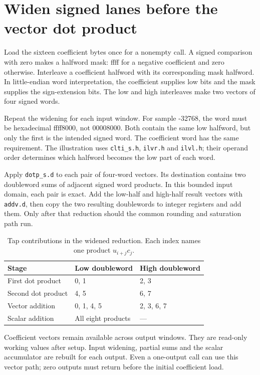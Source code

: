 \section{Widen signed lanes before the vector dot product}
Load the sixteen coefficient bytes once for a nonempty call. A signed comparison
with zero makes a halfword mask: ffff for a negative coefficient and zero otherwise.
Interleave a coefficient halfword with its corresponding mask halfword. In little-endian
word interpretation, the coefficient supplies low bits and the mask supplies the
sign-extension bits. The low and high interleaves make two vectors of four signed words.

Repeat the widening for each input window. For sample -32768, the word must be
hexadecimal ffff8000, not 00008000. Both contain the same low halfword, but only the
first is the intended signed word. The coefficient word has the same requirement.
The illustration uses \texttt{clti\_s.h}, \texttt{ilvr.h} and \texttt{ilvl.h}; their
operand order determines which halfword becomes the low part of each word.

Apply \texttt{dotp\_s.d} to each pair of four-word vectors. Its destination contains
two doubleword sums of adjacent signed word products. In this bounded input domain,
each pair is exact. Add the low-half and high-half result vectors with \texttt{addv.d},
then copy the two resulting doublewords to integer registers and add them. Only after
that reduction should the common rounding and saturation path run.

\begin{table}[htbp]
  \centering
  \caption{Tap contributions in the widened reduction. Each index names one product \(u_{i+j}c_j\).}
  \begin{tabular}{lll}
    \toprule
    Stage              & Low doubleword     & High doubleword \\
    \midrule
    First dot product  & 0, 1               & 2, 3            \\
    Second dot product & 4, 5               & 6, 7            \\
    Vector addition    & 0, 1, 4, 5         & 2, 3, 6, 7      \\
    Scalar addition    & All eight products & ---             \\
    \bottomrule
  \end{tabular}
\end{table}

Coefficient vectors remain available across output windows. They are read-only working
values after setup. Input widening, partial sums and the scalar accumulator are rebuilt
for each output. Even a one-output call can use this vector path; zero outputs must
return before the initial coefficient load.

